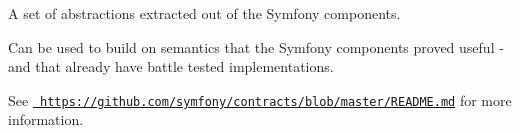 A set of abstractions extracted out of the Symfony components.

Can be used to build on semantics that the Symfony components proved useful -\/ and that already have battle tested implementations.

See \href{https://github.com/symfony/contracts/blob/master/README.md}{\texttt{ https\+://github.\+com/symfony/contracts/blob/master/\+README.\+md}} for more information. 